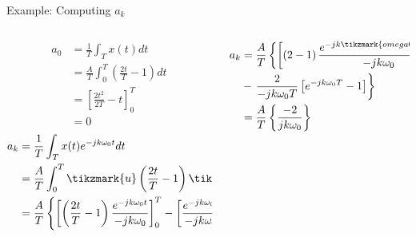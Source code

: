 \begin{frame}
Example: Computing $a_k$
    \begin{columns}
        \begin{column}{0.5\textwidth}
            \begin{align*}
                a_0 &= \frac{1}{T}\int_T x(t)dt\\
                &= \frac{A}{T}\int_0^T \left(\frac{2t}{T} - 1\right)dt\\
                &= \left[\frac{2t^2}{2T}-t\right]_0^T\\
                &= 0
            \end{align*}
            \pause
            \begin{align*}
                a_k &= \frac{1}{T}\int_T x(t)e^{-jk\omega_0 t}dt\\
                    &= \frac{A}{T}\int_0^T \tikzmark{u}\left(\frac{2t}{T} - 1\right) \tikzmark{dv}e^{-jk\omega_0 t}dt\\
                    &=  \frac{A}{T}\left\{ \left[ \left(\frac{2t}{T}-1\right)\frac{e^{-jk\omega_0 t}}{-jk\omega_0}\right]_0^T -  \left[\frac{e^{-jk\omega_0 t}}{-jk\omega_0}\frac{2}{T}\right]_0^T\right\}
            \end{align*}
        \end{column}
        \begin{column}{0.5\textwidth}
        \pause
            \begin{align*}
                a_k &= \frac{A}{T}\left\{
                 \left[ \left(2-1\right)\frac{e^{-jk\tikzmark{omega0t}\omega_0 T}}{-jk\omega_0} - \frac{(-1)}{-jk\omega_0}\right]\right.\\
                 &-  \left.\frac{2}{-jk\omega_0T}\left[e^{-jk\omega_0T} - 1\right]
                 \right\}\\
                 &= \frac{A}{T}\left\{ \frac{-2}{jk\omega_0} \right\}\\

\end{align*}
\end{column}
\end{columns}
\end{frame}
